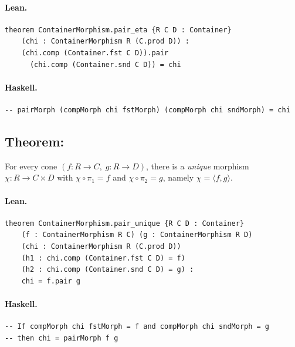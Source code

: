 \documentclass[11pt,a4paper]{article}
\begin{document}
\paragraph{Lean.}
\begin{lstlisting}[style=lean]
theorem ContainerMorphism.pair_eta {R C D : Container}
    (chi : ContainerMorphism R (C.prod D)) :
    (chi.comp (Container.fst C D)).pair
      (chi.comp (Container.snd C D)) = chi
\end{lstlisting}

\paragraph{Haskell.}
\begin{lstlisting}[style=haskell]
-- pairMorph (compMorph chi fstMorph) (compMorph chi sndMorph) = chi
\end{lstlisting}


\subsection{Theorem: }

\begin{thm}
For every cone $(f : R \to C,\; g : R \to D)$, there is a \emph{unique}
morphism $\chi : R \to C \times D$ with $\chi \circ \pi_1 = f$ and
$\chi \circ \pi_2 = g$, namely $\chi = \langle f, g \rangle$.
\end{thm}

\paragraph{Lean.}
\begin{lstlisting}[style=lean]
theorem ContainerMorphism.pair_unique {R C D : Container}
    (f : ContainerMorphism R C) (g : ContainerMorphism R D)
    (chi : ContainerMorphism R (C.prod D))
    (h1 : chi.comp (Container.fst C D) = f)
    (h2 : chi.comp (Container.snd C D) = g) :
    chi = f.pair g
\end{lstlisting}

\paragraph{Haskell.}
\begin{lstlisting}[style=haskell]
-- If compMorph chi fstMorph = f and compMorph chi sndMorph = g
-- then chi = pairMorph f g
\end{lstlisting}
\end{document}
